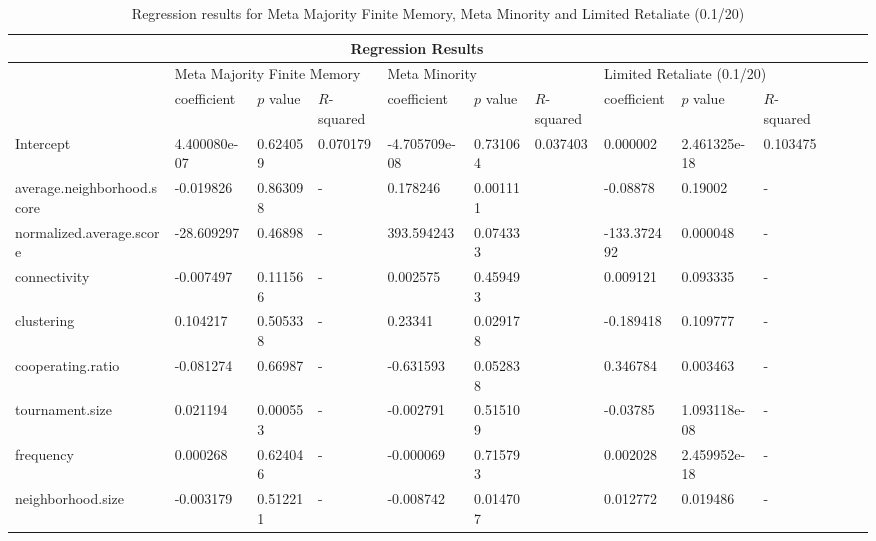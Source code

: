 \begin{table}[!hbtp]
	\centering
	\begin{adjustbox}{width=0.9\textwidth}
		\small
		\begin{tabular}{|l|l|l|l|l|l|l|l|l|l|l|l|l|}
			\toprule
			\multicolumn{10}{|c|}{\textbf{Regression Results}}                                                                       \\ \hline
			& \multicolumn{3}{l|}{Meta Majority Finite Memory} & \multicolumn{3}{l|}{Meta Minority} & \multicolumn{3}{l|}{Limited Retaliate (0.1/20)}\\ \hline
			                           & coefficient  & \(p\) value & \(R\)-squared & coefficient   & \(p\) value & \(R\)-squared & coefficient & \(p\) value  & \(R\)-squared \\ \hline
			Intercept                  & 4.400080e-07 & 0.624059    & 0.070179      & -4.705709e-08 & 0.731064    & 0.037403      & 0.000002    & 2.461325e-18 & 0.103475      \\ \hline
			average.neighborhood.score & -0.019826    & 0.863098    & -             & 0.178246      & 0.001111    &               & -0.08878    & 0.19002      & -             \\ \hline
			normalized.average.score   & -28.609297   & 0.46898     & -             & 393.594243    & 0.074333    &               & -133.372492 & 0.000048     & -             \\ \hline
			connectivity               & -0.007497    & 0.111566    & -             & 0.002575      & 0.459493    &               & 0.009121    & 0.093335     & -             \\ \hline
			clustering                 & 0.104217     & 0.505338    & -             & 0.23341       & 0.029178    &               & -0.189418   & 0.109777     & -             \\ \hline
			cooperating.ratio          & -0.081274    & 0.66987     & -             & -0.631593     & 0.052838    &               & 0.346784    & 0.003463     & -             \\ \hline
			tournament.size            & 0.021194     & 0.000553    & -             & -0.002791     & 0.515109    &               & -0.03785    & 1.093118e-08 & -             \\ \hline
			frequency                  & 0.000268     & 0.624046    & -             & -0.000069     & 0.715793    &               & 0.002028    & 2.459952e-18 & -             \\ \hline
			neighborhood.size          & -0.003179    & 0.512211    & -             & -0.008742     & 0.014707    &               & 0.012772    & 0.019486     & -             \\ \bottomrule
		\end{tabular}
	\end{adjustbox}
	\caption{Regression results for ​Meta Majority Finite Memory, Meta Minority and Limited Retaliate (0.1/20)}
	\label{reg-for-bot}
\end{table}

